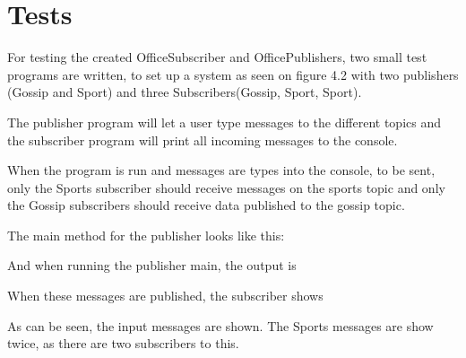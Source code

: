 \section{Tests}
For testing the created OfficeSubscriber and OfficePublishers, two small test programs are written, to set up a system as seen on figure 4.2 with two publishers (Gossip and Sport) and three Subscribers(Gossip, Sport, Sport). 

The publisher program will let a user type messages to the different topics and the subscriber program will print all incoming messages to the console.

When the program is run and messages are types into the console, to be sent, only the Sports subscriber should receive messages on the sports topic and only the Gossip subscribers should receive data published to the gossip topic. 

The main method for the publisher looks like this:

\begin{center}
\end{center}

And when running the publisher main, the output is 

\begin{center}
\end{center}

When these messages are published, the subscriber shows 

\begin{center}
\end{center}

As can be seen, the input messages are shown. The Sports messages are show twice, as there are two subscribers to this.